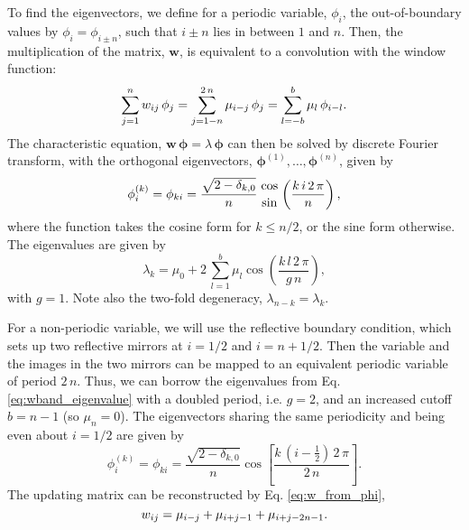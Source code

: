 \documentclass[reprint, superscriptaddress, floatfix]{revtex4-1}
\begin{document}
To find the eigenvectors,
we define for a periodic variable, $\phi_i$,
the out-of-boundary values by
$\phi_i = \phi_{i \pm n}$,
%
such that $i \pm n$ lies in between $1$ and $n$.
%
Then, the multiplication of the matrix, $\mathbf w$,
is equivalent to a convolution with the window function:
%
\begin{equation}
  \sum_{ j = 1 }^n
    w_{ij} \, \phi_j
  =
  \sum_{ j = 1 - n }^{ 2 \, n }
    \mu_{i - j} \, \phi_j
  =
  \sum_{ l = -b }^{ b }
    \mu_l \, \phi_{ i - l}
  .
  \notag
\end{equation}
%
The characteristic equation,
$\mathbf w \, \pmb\phi = \lambda \, \pmb\phi$
can then be solved by discrete Fourier transform,
with the orthogonal eigenvectors,
$\pmb\phi^{(1)}, \dots, \pmb\phi^{(n)}$,
given by
%
\begin{equation}
  \phi^{(k)}_i
  =
  \phi_{ki}
  =
  \frac{ \sqrt{ 2 - \delta_{k,0} } } { n }
  \,
  {\cos \atop \sin}
  \left(
    \frac{ k \, i \, 2 \, \pi }
         {      n             }
  \right)
  ,
  \notag
\end{equation}
%
where the function takes the cosine form for $k \le n/2$,
or the sine form otherwise.
%
The eigenvalues are given by
\begin{equation}
  \lambda_k
  =
  \mu_0
  +
  2 \,
  \sum_{ l = 1 }^b
  \mu_l
  \cos\left(
  \frac{ k \, l \, 2 \, \pi }
       {      g \, n        }
  \right)
  ,
  \label{eq:wband_eigenvalue}
\end{equation}
%
with $g = 1$.
Note also the two-fold degeneracy,
  $\lambda_{n - k} = \lambda_k$.


For a non-periodic variable,
we will use the reflective boundary condition\cite{bussi2006},
which sets up two reflective mirrors at
$i = 1/2$ and $i = n + 1/2$.
%
Then the variable and the images in the two mirrors
can be mapped to an equivalent periodic variable of period $2 \, n$.
%
Thus, we can borrow the eigenvalues from
Eq. \eqref{eq:wband_eigenvalue}
with a doubled period, i.e. $g = 2$,
and an increased cutoff $b = n - 1$
(so $\mu_n = 0$).
%
The eigenvectors sharing the same periodicity
and being even about $i = 1/2$ are given by
%
\begin{equation}
  \phi^{(k)}_i
  =
  \phi_{k i}
  =
  \frac{ \sqrt{ 2 - \delta_{k, 0} } }
       {             n              }
  \cos \left[
       \frac{ k \, \left( i - \frac 1 2 \right) \, 2 \, \pi}
            {             2 \, n                           }
       \right]
  .
  \label{eq:wband_eigenvector_refl}
\end{equation}
%
The updating matrix can be reconstructed
by Eq. \eqref{eq:w_from_phi},
%
%
\begin{equation}
  w_{ij}
  =
  \mu_{ i - j }
  +
  \mu_{ i + j - 1 }
  +
  \mu_{ i + j - 2 n - 1 }
  .
  \notag
\end{equation}
%
\end{document}
